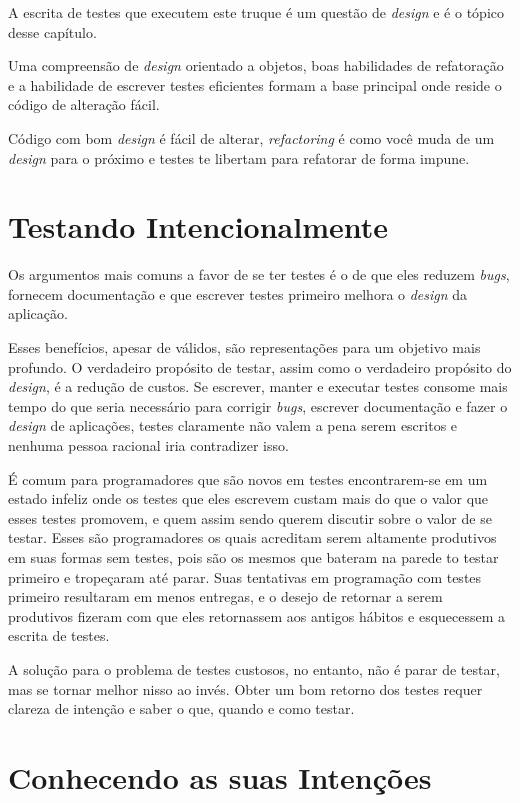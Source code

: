 A escrita de testes que executem este truque é um questão de \textit{design} e é o tópico desse capítulo.

Uma compreensão de \textit{design} orientado a objetos, boas habilidades de refatoração e a habilidade de escrever testes eficientes formam a base principal onde reside o código de alteração fácil.

Código com bom \textit{design} é fácil de alterar, \textit{refactoring} é como você muda de um \textit{design} para o próximo e testes te libertam para refatorar de forma impune. 

\section{Testando Intencionalmente}

Os argumentos mais comuns a favor de se ter testes é o de que eles reduzem \textit{bugs}, fornecem documentação e que escrever testes primeiro melhora o \textit{design} da aplicação.

Esses benefícios, apesar de válidos, são representações para um objetivo mais profundo. O verdadeiro propósito de testar, assim como o verdadeiro propósito do \textit{design}, é a redução de custos. Se escrever, manter e executar testes consome mais tempo do que seria necessário para corrigir \textit{bugs}, escrever documentação e fazer o \textit{design} de aplicações, testes claramente não valem a pena serem escritos e nenhuma pessoa racional iria contradizer isso.

É comum para programadores que são novos em testes encontrarem-se em um estado infeliz onde os testes que eles escrevem custam mais do que o valor que esses testes promovem, e quem assim sendo querem discutir sobre o valor de se testar. Esses são programadores os quais acreditam serem altamente produtivos em suas formas sem testes, pois são os mesmos que bateram na parede to testar primeiro e tropeçaram até parar. Suas tentativas em programação com testes primeiro resultaram em menos entregas, e o desejo de retornar a serem produtivos fizeram com que eles retornassem aos antigos hábitos e esquecessem a escrita de testes.

A solução para o problema de testes custosos, no entanto, não é parar de testar, mas se tornar melhor nisso ao invés. Obter um bom retorno dos testes requer clareza de intenção e saber o que, quando e como testar.

\section{Conhecendo as suas Intenções}

